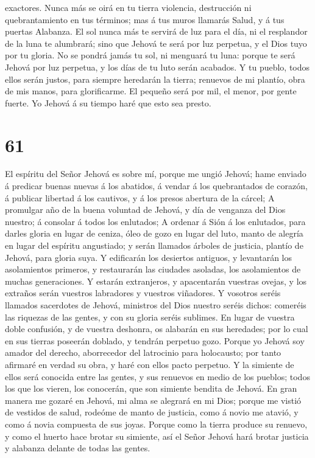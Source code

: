 exactores.  Nunca más se oirá en tu tierra violencia,
destrucción ni quebrantamiento en tus términos; mas á tus muros llamarás
Salud, y á tus puertas Alabanza.  El sol nunca más te
servirá de luz para el día, ni el resplandor de la luna te alumbrará;
sino que Jehová te será por luz perpetua, y el Dios tuyo por tu gloria.
 No se pondrá jamás tu sol, ni menguará tu luna: porque
te será Jehová por luz perpetua, y los días de tu luto serán acabados.
 Y tu pueblo, todos ellos serán justos, para siempre
heredarán la tierra; renuevos de mi plantío, obra de mis manos, para
glorificarme.  El pequeño será por mil, el menor, por
gente fuerte. Yo Jehová á su tiempo haré que esto sea presto.

\hypertarget{section-60}{%
\section{61}\label{section-60}}

 El espíritu del Señor Jehová es sobre mí, porque me ungió
Jehová; hame enviado á predicar buenas nuevas á los abatidos, á vendar á
los quebrantados de corazón, á publicar libertad á los cautivos, y á los
presos abertura de la cárcel;  A promulgar año de la buena
voluntad de Jehová, y día de venganza del Dios nuestro; á consolar á
todos los enlutados;  A ordenar á Sión á los enlutados,
para darles gloria en lugar de ceniza, óleo de gozo en lugar del luto,
manto de alegría en lugar del espíritu angustiado; y serán llamados
árboles de justicia, plantío de Jehová, para gloria suya. 
Y edificarán los desiertos antiguos, y levantarán los asolamientos
primeros, y restaurarán las ciudades asoladas, los asolamientos de
muchas generaciones.  Y estarán extranjeros, y apacentarán
vuestras ovejas, y los extraños serán vuestros labradores y vuestros
viñadores.  Y vosotros seréis llamados sacerdotes de
Jehová, ministros del Dios nuestro seréis dichos: comeréis las riquezas
de las gentes, y con su gloria seréis sublimes.  En lugar
de vuestra doble confusión, y de vuestra deshonra, os alabarán en sus
heredades; por lo cual en sus tierras poseerán doblado, y tendrán
perpetuo gozo.  Porque yo Jehová soy amador del derecho,
aborrecedor del latrocinio para holocausto; por tanto afirmaré en verdad
su obra, y haré con ellos pacto perpetuo.  Y la simiente
de ellos será conocida entre las gentes, y sus renuevos en medio de los
pueblos; todos los que los vieren, los conocerán, que son simiente
bendita de Jehová.  En gran manera me gozaré en Jehová,
mi alma se alegrará en mi Dios; porque me vistió de vestidos de salud,
rodeóme de manto de justicia, como á novio me atavió, y como á novia
compuesta de sus joyas.  Porque como la tierra produce su
renuevo, y como el huerto hace brotar su simiente, así el Señor Jehová
hará brotar justicia y alabanza delante de todas las gentes.

